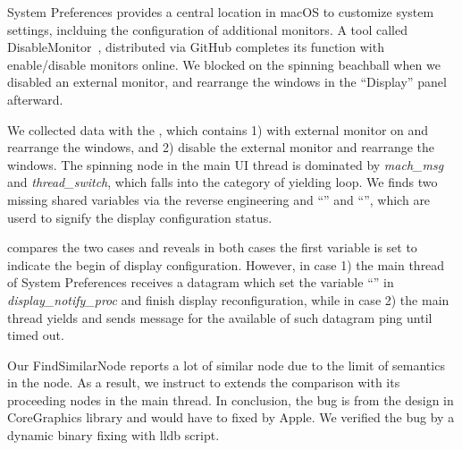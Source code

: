 System Preferences provides a central location in macOS to customize system
settings, inclduing the configuration of additional monitors. A tool called
DisableMonitor~\cite{disablemonitor}, distributed via GitHub completes its
function with enable/disable monitors online. We blocked on the spinning
beachball when we disabled an external monitor, and rearrange the windows in the
``Display'' panel afterward.

We collected data with the \xxx, which contains 1) with external monitor
on and rearrange the windows, and 2) disable the external monitor and
rearrange the windows. The spinning node in the main UI thread is dominated by
\textit{mach\_msg} and \textit{thread\_switch}, which falls into the category of
yielding loop. We finds two missing shared variables via the reverse engineering
and ``'' and ``'',
which are userd to signify the display configuration status.

\xxx compares the two cases and reveals in both cases the first variable is
set to indicate the begin of display configuration. However, in case 1) the
main thread of System Preferences receives a datagram which set the variable
``'' in \textit{display\_notify\_proc} and finish
display reconfiguration, while in case 2) the main thread yields and sends
message for the available of such datagram ping until timed out.

Our FindSimilarNode reports a lot of similar node due to the limit of semantics
in the node. As a result, we instruct \xxx to extends the comparison with its
proceeding nodes in the main thread. In conclusion, the bug is from the design
in CoreGraphics library and would have to fixed by Apple. We verified the bug by
a dynamic binary fixing with lldb script.

